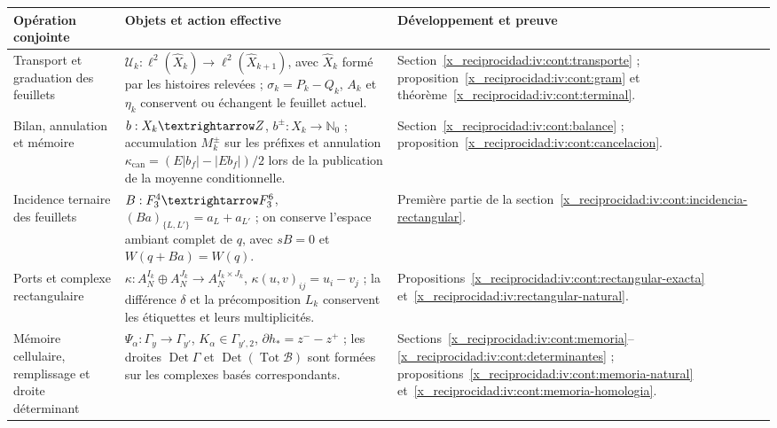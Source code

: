 \begin{center}
\small
\begin{tabular}{@{}p{.21\linewidth}p{.48\linewidth}p{.23\linewidth}@{}}
\toprule
Opération conjointe & Objets et action effective & Développement et preuve\\
\midrule
Transport et graduation des feuillets
& \(\mathcal U_k:\ell^2(\widehat X_k)\to
\ell^2(\widehat X_{k+1})\), avec \(\widehat X_k\) formé par les histoires relevées ; \(\sigma_k=P_k-Q_k\), \(A_k\) et \(\eta_k\) conservent ou échangent le feuillet actuel.
& Section~\ref{x_reciprocidad:iv:cont:transporte} ; proposition~\ref{x_reciprocidad:iv:cont:gram}
et théorème~\ref{x_reciprocidad:iv:cont:terminal}.\\[5pt]
Bilan, annulation et mémoire
& \(b:X_k\to\ZZ\), \(b^\pm:X_k\to\mathbb N_0\) ;
accumulation \(M_k^\pm\) sur les préfixes et annulation
\(\kappa_{\mathrm{can}}=(E|b_f|-|Eb_f|)/2\) lors de la publication
de la moyenne conditionnelle.
& Section~\ref{x_reciprocidad:iv:cont:balance} ; proposition~\ref{x_reciprocidad:iv:cont:cancelacion}.\\[5pt]
Incidence ternaire des feuillets
& \(B:\FF_3^4\to\FF_3^6\),
\((Ba)_{\{L,L'\}}=a_L+a_{L'}\) ; on conserve l’espace ambiant
complet de \(q\), avec \(sB=0\) et \(W(q+Ba)=W(q)\).
& Première partie de la section~\ref{x_reciprocidad:iv:cont:incidencia-rectangular}.\\[5pt]
Ports et complexe rectangulaire
& \(\kappa:A_N^{I_k}\oplus A_N^{J_k}\to
A_N^{I_k\times J_k}\), \(\kappa(u,v)_{ij}=u_i-v_j\) ; la différence \(\delta\) et la précomposition \(L_k\) conservent les étiquettes et leurs multiplicités.
& Propositions~\ref{x_reciprocidad:iv:cont:rectangular-exacta}
et~\ref{x_reciprocidad:iv:rectangular-natural}.\\[5pt]
Mémoire cellulaire, remplissage et droite déterminant
& \(\Psi_\alpha:\Gamma_y\to\Gamma_{y'}\),
\(K_\alpha\in\Gamma_{y',2}\),
\(\partial h_*=z^--z^+\) ; les droites
\(\operatorname{Det}\Gamma\) et
\(\operatorname{Det}(\operatorname{Tot}\mathcal B)\)
sont formées sur les complexes basés correspondants.
& Sections~\ref{x_reciprocidad:iv:cont:memoria}--\ref{x_reciprocidad:iv:cont:determinantes} ;
propositions~\ref{x_reciprocidad:iv:cont:memoria-natural}
et~\ref{x_reciprocidad:iv:cont:memoria-homologia}.\\
\bottomrule
\end{tabular}
\end{center}

